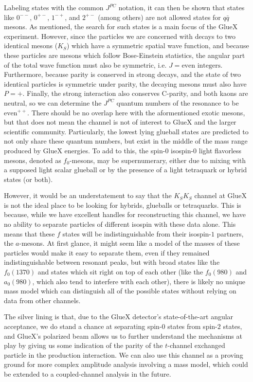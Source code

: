 Labeling states with the common $J^{PC}$ notation, it can then be shown that states like $0^{--}$, $0^{+-}$, $1^{-+}$, and $2^{+-}$ (among others) are not allowed states for $q\bar{q}$ mesons. As mentioned, the search for such states is a main focus of the GlueX experiment. However, since the particles we are concerned with decays to two identical mesons ($K_S$) which have a symmetric spatial wave function, and because these particles are mesons which follow Bose-Einstein statistics, the angular part of the total wave function must also be symmetric, i.e. $J = \text{even integers}$. Furthermore, because parity is conserved in strong decays, and the state of two identical particles is symmetric under parity, the decaying mesons must also have $P=+$. Finally, the strong interaction also conserves C-parity, and both kaons are neutral, so we can determine the $J^{PC}$ quantum numbers of the resonance to be $\text{even}^{++}$. There should be no overlap here with the aformentioned exotic mesons, but that does not mean the channel is not of interest to GlueX and the larger scientific community. Particularly, the lowest lying glueball states are predicted to not only share these quantum numbers, but exist in the middle of the mass range produced by GlueX energies\cite{morningstar_glueball_1999}. To add to this, the spin-$0$ isospin-$0$ light flavorless mesons, denoted as $f_0$-mesons, may be supernumerary, either due to mixing with a supposed light scalar glueball or by the presence of a light tetraquark or hybrid states (or both)\cite{particle_data_group_review_2020}.

However, it would be an understatement to say that the $K_SK_S$ channel at GlueX is not the ideal place to be looking for hybrids, glueballs or tetraquarks. This is because, while we have excellent handles for reconstructing this channel, we have no ability to separate particles of different isospin with these data alone. This means that these $f$ states will be indistinguishable from their isospin-$1$ partners, the $a$-mesons. At first glance, it might seem like a model of the masses of these particles would make it easy to separate them, even if they remained indistinguishable between resonant peaks, but with broad states like the $f_0(1370)$ and states which sit right on top of each other (like the $f_0(980)$ and $a_0(980)$, which also tend to interfere with each other), there is likely no unique mass model which can distinguish all of the possible states without relying on data from other channels.

The silver lining is that, due to the GlueX detector's state-of-the-art angular acceptance\cite{adhikari_gluex_2021}, we do stand a chance at separating spin-$0$ states from spin-$2$ states, and GlueX's polarized beam allows us to further understand the mechanisms at play by giving us some indication of the parity of the $t$-channel exchanged particle in the production interaction. We can also use this channel as a proving ground for more complex amplitude analysis involving a mass model, which could be extended to a coupled-channel analysis in the future.


